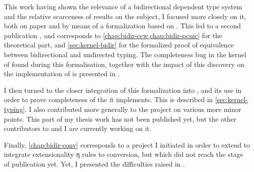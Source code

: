 This work having shown the relevance of a bidirectional dependent type system and the relative
scarceness of results on the subject, I focused more closely on it, both on
paper and by means of a formalization based on . This led to a second publication
, and corresponds to \cref{chap:bidir-ccw,chap:bidir-pcuic}
for the theoretical part, and \cref{sec:kernel-bidir} for the formalized proof
of equivalence between bidirectional and undirected typing.
The completeness bug in the kernel of  found during this formalisation, together with
the impact of this discovery on the implementation of  is presented in
.

I then turned to the closer integration of this formalization into , and its use
in order to prove completeness of the  it implements.%
This is described in \cref{sec:kernel-typing}.
I also contributed more generally to the project on various more minor points.
This part of my thesis work has not been published yet, but the other contributors to
 and I are currently working on it.

Finally, \cref{chap:bidir-conv} corresponds to a project I initiated in order to extend
 to integrate extensionality η rules to conversion,
but which did not reach the stage of publication yet. Yet, I presented the difficulties
raised in .